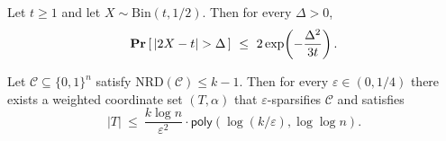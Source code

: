 \documentclass[10pt,a4paper]{amsart}
\newcommand{\calC}{\mathcal{C}}
\newcommand{\poly}{\mathsf{poly}}
\renewcommand{\Pr}{\mathop{\bf Pr\/}}
\begin{document}
\begin{lemma}\label{lem:sparsif_chernoff_v2}
Let $t\ge 1$ and let $X\sim \mathrm{Bin}(t,1/2)$. Then for every $\Delta>0$,
\[
\Pr\left[\,|2X-t|>\Delta\,\right]\ \le\ 2\exp\!\left(-\frac{\Delta^2}{3t}\right).
\]
\end{lemma}

\begin{theorem}
\label{thm:sparsif_single_log_n_v2}
Let $\calC\subseteq\{0,1\}^n$ satisfy $\mathrm{NRD}(\calC)\le k-1$.
Then for every $\varepsilon\in(0,1/4)$ there exists a weighted coordinate set $(T,\alpha)$
that $\varepsilon$-sparsifies $\calC$ and satisfies
\[
|T|
\ \le\
\frac{k\log n}{\varepsilon^2}\cdot \poly\!\left(\log(k/\varepsilon),\log\log n\right).
\]
\end{theorem}
\end{document}
